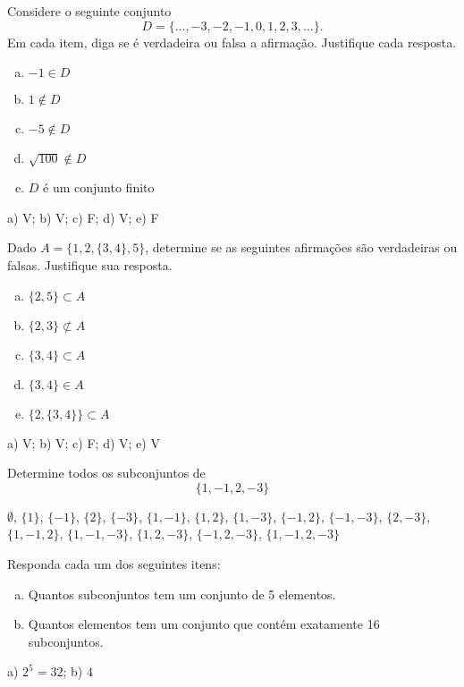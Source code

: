\begin{exer}
  Considere o seguinte conjunto
  \begin{equation}
    D = \{...,-3,-2,-1,0,1,2,3,...\}.
  \end{equation}
  Em cada item, diga se é verdadeira ou falsa a afirmação. Justifique cada resposta.
  \begin{enumerate}[a)]
  \item $-1\in D$
  \item $1\not\in D$
  \item $-5\not\in D$
  \item $\sqrt{100}\not\in D$
  \item $D$ é um conjunto finito
  \end{enumerate}
\end{exer}
\begin{resp}
  a) V; b) V; c) F; d) V; e) F
\end{resp}

\begin{exer}
  Dado $A = \{1, 2, \{3, 4\}, 5\}$, determine se as seguintes afirmações são verdadeiras ou falsas. Justifique sua resposta.
  \begin{enumerate}[a)]
  \item $\{2,5\}\subset A$
  \item $\{2,3\}\not\subset A$
  \item $\{3, 4\}\subset A$
  \item $\{3, 4\}\in A$
  \item $\{2, \{3, 4\}\} \subset A$
  \end{enumerate}
\end{exer}
\begin{resp}
  a) V; b) V; c) F; d) V; e) V
\end{resp}

\begin{exer}
  Determine todos os subconjuntos de
  \begin{equation}
    \{1, -1, 2, -3\}
  \end{equation}
\end{exer}
\begin{resp}
  $\emptyset$, $\{1\}$, $\{-1\}$, $\{2\}$, $\{-3\}$, $\{1,-1\}$, $\{1,2\}$, $\{1,-3\}$, $\{-1,2\}$, $\{-1,-3\}$, $\{2,-3\}$, $\{1,-1,2\}$, $\{1,-1,-3\}$, $\{1,2,-3\}$, $\{-1,2,-3\}$, $\{1,-1,2,-3\}$
\end{resp}

\begin{exer}
  Responda cada um dos seguintes itens:
  \begin{enumerate}[a)]
  \item Quantos subconjuntos tem um conjunto de 5 elementos.
  \item Quantos elementos tem um conjunto que contém exatamente 16 subconjuntos.
  \end{enumerate}
\end{exer}
\begin{resp}
  a) $2^5 = 32$; b) $4$ 
\end{resp}

